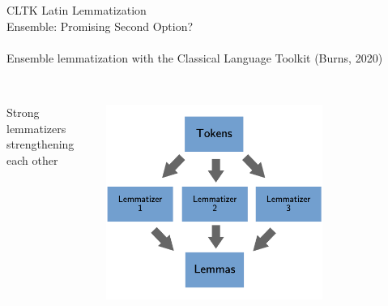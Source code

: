 \documentclass[aspectratio=169,xcolor=dvipsnames]{beamer}
\begin{document}
\begin{frame}[t]{CLTK Latin Lemmatization}
\ \\

 {\Large Ensemble: Promising Second Option?}\\ \ \\
 Ensemble lemmatization with the Classical Language Toolkit (Burns, 2020) \\ \ \\
    \begin{columns}
        \begin{column}{0.5\textwidth}
                Strong lemmatizers strengthening each other \\
    \ \\
        \end{column}
         \begin{column}{0.5\textwidth}
         \centering
                \includegraphics[width=0.7\textwidth]{ensemble_model_v3.png} \\ \ \\
        \end{column}
    \end{columns}
    
\end{frame}
\end{document}
